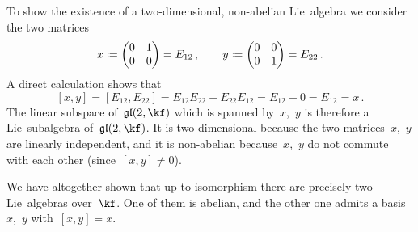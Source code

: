 \begin{example}
  To show the existence of a two-dimensional, non-abelian Lie~algebra we consider the two matrices
  \[
    x
    \coloneqq
    \begin{pmatrix}
      0 & 1 \\
      0 & 0
    \end{pmatrix}
    =
    E_{12}  \,,
    \qquad
    y
    \coloneqq
    \begin{pmatrix}
      0 & 0 \\
      0 & 1
    \end{pmatrix}
    =
    E_{22}  \,.
  \]
  A direct calculation shows that
  \[
    [x,y]
    =
    [E_{12}, E_{22}]
    =
    E_{12} E_{22} - E_{22} E_{12}
    =
    E_{12} - 0
    =
    E_{12}
    =
    x \,.
  \]
  The linear subspace of~$\gllie(2, \kf)$ which is spanned by~$x$,~$y$ is therefore a Lie~subalgebra of~$\gllie(2, \kf)$.
  It is two-dimensional because the two matrices~$x$,~$y$ are linearly independent, and it is non-abelian because~$x$,~$y$ do not commute with each other (since~$[x,y] \neq 0$).

  We have altogether shown that up to isomorphism there are precisely two {\twodimensional} Lie~algebras over~$\kf$.
  One of them is abelian, and the other one admits a basis~$x$,~$y$ with~$[x,y] = x$.
\end{example}

